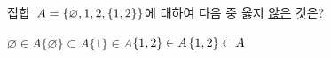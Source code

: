 집합~$A=\{\varnothing{,}\mkern3mu\mathopen{}1{,}\mkern3mu\mathopen{}2{,}\mkern3mu\mathopen{}\{1{,}\mkern3mu\mathopen{}2\}\}$에 대하여 다음 중 옳지 \underline{않은} 것은?
\begin{choices32}{$\varnothing\in A$}{$\{\varnothing\}\subset A$}{$\{1\}\in A$}{$\{1{,}\mkern3mu\mathopen{}2\}\in A$}{$\{1{,}\mkern3mu\mathopen{}2\}\subset A$}\end{choices32}
